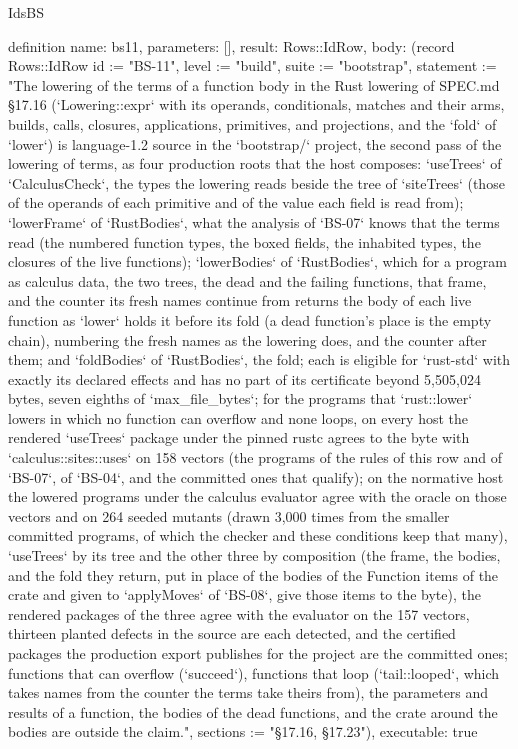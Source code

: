 \begin{lexlean}{IdsBS}
\begin{semanticmodule}
definition{
  name: bs11,
  parameters: [],
  result: Rows::IdRow,
  body: (record Rows::IdRow {id := "BS-11", level := "build", suite := "bootstrap", statement := "The lowering of the terms of a function body in the Rust lowering of SPEC.md §17.16 (`Lowering::expr` with its operands, conditionals, matches and their arms, builds, calls, closures, applications, primitives, and projections, and the `fold` of `lower`) is language-1.2 source in the `bootstrap/` project, the second pass of the lowering of terms, as four production roots that the host composes: `useTrees` of `CalculusCheck`, the types the lowering reads beside the tree of `siteTrees` (those of the operands of each primitive and of the value each field is read from); `lowerFrame` of `RustBodies`, what the analysis of `BS-07` knows that the terms read (the numbered function types, the boxed fields, the inhabited types, the closures of the live functions); `lowerBodies` of `RustBodies`, which for a program as calculus data, the two trees, the dead and the failing functions, that frame, and the counter its fresh names continue from returns the body of each live function as `lower` holds it before its fold (a dead function's place is the empty chain), numbering the fresh names as the lowering does, and the counter after them; and `foldBodies` of `RustBodies`, the fold; each is eligible for `rust-std` with exactly its declared effects and has no part of its certificate beyond 5,505,024 bytes, seven eighths of `max_file_bytes`; for the programs that `rust::lower` lowers in which no function can overflow and none loops, on every host the rendered `useTrees` package under the pinned rustc agrees to the byte with `calculus::sites::uses` on 158 vectors (the programs of the rules of this row and of `BS-07`, of `BS-04`, and the committed ones that qualify); on the normative host the lowered programs under the calculus evaluator agree with the oracle on those vectors and on 264 seeded mutants (drawn 3,000 times from the smaller committed programs, of which the checker and these conditions keep that many), `useTrees` by its tree and the other three by composition (the frame, the bodies, and the fold they return, put in place of the bodies of the Function items of the crate and given to `applyMoves` of `BS-08`, give those items to the byte), the rendered packages of the three agree with the evaluator on the 157 vectors, thirteen planted defects in the source are each detected, and the certified packages the production export publishes for the project are the committed ones; functions that can overflow (`succeed`), functions that loop (`tail::looped`, which takes names from the counter the terms take theirs from), the parameters and results of a function, the bodies of the dead functions, and the crate around the bodies are outside the claim.", sections := "§17.16, §17.23"}),
  executable: true
}


\end{semanticmodule}
\end{lexlean}
